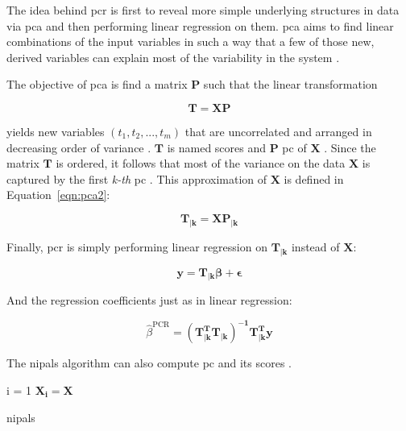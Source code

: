 The idea behind \acrfull{pcr} is first to reveal more simple underlying structures in data \cite{shlens2014} via \acrfull{pca}  and then performing linear regression on them. \acrshort{pca} aims to find linear combinations of the input variables in such a way that a few of those new, derived variables can explain most of the variability in the system \cite{johnson2002}.

The objective of \acrshort{pca} is find a matrix $\mathbf{P}$ such that the linear transformation

\begin{equation}
	\label{eqn:pca}
	\mathbf{T=XP}
\end{equation}

yields new variables $(t_1, t_2, ..., t_m)$ that are uncorrelated and arranged in decreasing order of variance . $\mathbf{T}$ is named scores and $\mathbf{P}$ \acrfull{pc} of $\mathbf{X}$ \cite{ng2013}. Since the matrix $\mathbf{T}$ is ordered, it follows that most of the variance on the data $\mathbf{X}$ is captured by the first \textit{k-th} \acrshort{pc} \cite{ng2013}. This approximation of $\mathbf{X}$ is defined in Equation~\ref{eqn:pca2}:

\begin{equation}
	\label{eqn:pca2}
	\mathbf{T_{|k}=XP_{|k}}
\end{equation}

Finally, \acrshort{pcr} is simply performing linear regression on $\mathbf{T_{|k}}$ instead of $\mathbf{X}$:
	
	\begin{equation}
		\label{eqn:pcr}
		\mathbf{y = T_{|k} \beta + \epsilon}
	\end{equation}

And the regression coefficients just as in linear regression:

\begin{equation}
	\label{eqn:beta-pcr}
	\hat{\beta}^{\text{PCR}} = \mathbf{(T_{|k}^T T_{|k})^{-1}T_{|k}^T y}
\end{equation}
	
The \acrfull{nipals} algorithm can also compute \acrlong{pc} and its scores \cite{ng2013} \cite{nipals2017}.


\begin{algorithm}[H]
	\label{algo:pca}
	\SetAlgoLined
	i = 1\;
	$\mathbf{X_i = X}$\;
	

	\caption{\acrfull{nipals}}
\end{algorithm}

